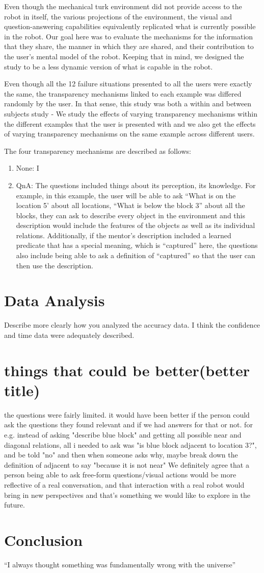 \documentclass[letterpaper]{article}
\begin{document}
Even though the mechanical turk environment did not provide access to the robot in itself, the various projections of the environment, the visual and question-answering capabilities equivalently replicated what is currently possible in the robot. Our goal here was to evaluate the mechanisms for the information that they share, the manner in which they are shared, and their contribution to the user's mental model of the robot. Keeping that in mind, we designed the study to be a less dynamic version of what is capable in the robot.

Even though all the 12 failure situations presented to all the users were exactly the same, the transparency mechanisms linked to each example was differed randomly by the user. In that sense, this study was both a within and between subjects study - We study the effects of varying transparency mechanisms within the different examples that the user is presented with and we also get the effects of varying transparency mechanisms on the same example across different users.

The four transparency mechanisms are described as follows:
\begin{enumerate}
    \item None: I
    \item QnA: The questions included things about its perception, its knowledge. For example, in this example, the user will be able to ask ``What is on the location 5' about all locations, ``What is below the block 3'' about all the blocks, they can ask to describe every object in the environment and this description would include the features of the objects as well as its individual relations. Additionally, if the mentor's description included a learned predicate that has a special meaning, which is ``captured'' here, the questions also include being able to ask a definition of ``captured'' so that the user can then use the description.
\end{enumerate}

\section{Data Analysis}
Describe more clearly how you analyzed the accuracy data. I think the confidence and time data were adequately described.
\section{things that could be better(better title)}
the questions were fairly limited. it would have been better if the person could ask the questions they found relevant and if we had answers for that or not. for e.g. instead of asking "describe blue block" and getting all possible near and diagonal relations, all i needed to ask was "is blue block adjacent to location 3?", and be told "no" and then when someone asks why, maybe break down the definition of adjacent to say "because it is not near"
We definitely agree that a person being able to ask free-form questions/visual actions would be more reflective of a real conversation, and that interaction with a real robot would bring in new perspectives and that's something we would like to explore in the future. 

\section{Conclusion}
``I always thought something was fundamentally wrong with the universe'' \citep{adams1995hitchhiker}


\end{document}
